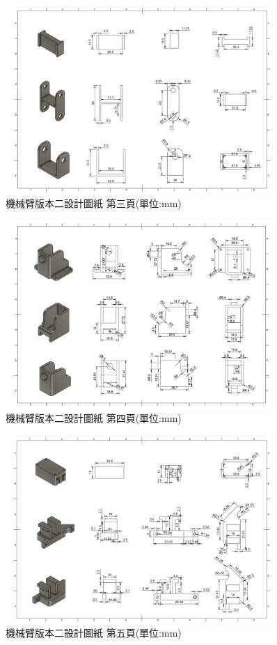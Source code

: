 \documentclass[class=NCU_thesis, crop=false]{standalone}
\begin{document}
\begin{figure}[htbp]
    \centering
    \includegraphics[width=0.9\textwidth]{figures/Armv2 (3).PNG}
    \caption{機械臂版本二設計圖紙 第三頁(單位:mm)}
\end{figure}

\begin{figure}[htbp]
    \centering
    \includegraphics[width=0.9\textwidth]{figures/Armv2 (4).PNG}
    \caption{機械臂版本二設計圖紙 第四頁(單位:mm)}
\end{figure}

\begin{figure}[htbp]
    \centering
    \includegraphics[width=0.9\textwidth]{figures/Armv2 (5).PNG}
    \caption{機械臂版本二設計圖紙 第五頁(單位:mm)}
\end{figure}
\end{document}
